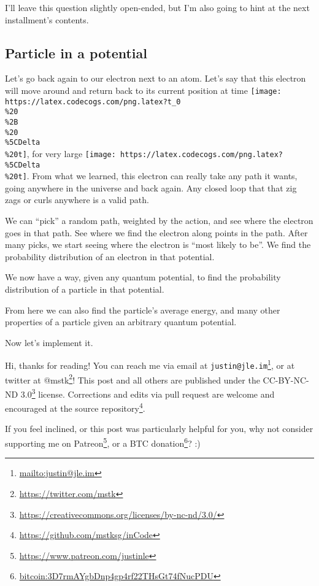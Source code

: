 \documentclass[]{article}
\renewcommand{\href}[2]{#2\footnote{\url{#1}}}
\begin{document}
I'll leave this question slightly open-ended, but I'm also going to hint at the
next installment's contents.

\hypertarget{particle-in-a-potential}{%
\subsection{Particle in a potential}\label{particle-in-a-potential}}

Let's go back again to our electron next to an atom. Let's say that this
electron will move around and return back to its current position at time
\texttt{[image: https://latex.codecogs.com/png.latex?t\_0\\\%20\\\%2B\\\%20\\\%5CDelta\\\%20t]},
for very large
\texttt{[image: https://latex.codecogs.com/png.latex?\\\%5CDelta\\\%20t]}. From what
we learned, this electron can really take any path it wants, going anywhere in
the universe and back again. Any closed loop that that zig zags or curls
anywhere is a valid path.

We can ``pick'' a random path, weighted by the action, and see where the
electron goes in that path. See where we find the electron along points in the
path. After many picks, we start seeing where the electron is ``most likely to
be''. We find the probability distribution of an electron in that potential.

We now have a way, given any quantum potential, to find the probability
distribution of a particle in that potential.

From here we can also find the particle's average energy, and many other
properties of a particle given an arbitrary quantum potential.

Now let's implement it.

Hi, thanks for reading! You can reach me via email at
\href{mailto:justin@jle.im}{\nolinkurl{justin@jle.im}}, or at twitter at
\href{https://twitter.com/mstk}{@mstk}! This post and all others are published
under the \href{https://creativecommons.org/licenses/by-nc-nd/3.0/}{CC-BY-NC-ND
3.0} license. Corrections and edits via pull request are welcome and encouraged
at \href{https://github.com/mstksg/inCode}{the source repository}.

If you feel inclined, or this post was particularly helpful for you, why not
consider \href{https://www.patreon.com/justinle}{supporting me on Patreon}, or a
\href{bitcoin:3D7rmAYgbDnp4gp4rf22THsGt74fNucPDU}{BTC donation}? :)
\end{document}
